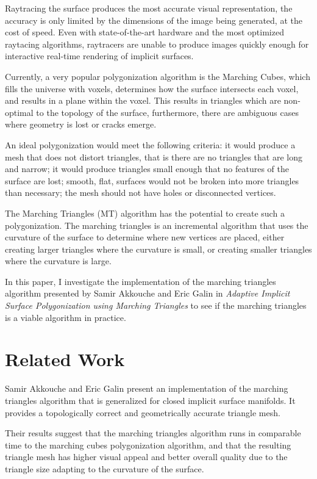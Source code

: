 \documentclass[conference]{acmsiggraph}
\begin{document}
Raytracing the surface produces the most accurate visual representation, the
accuracy is only limited by the dimensions of the image being generated, at the
cost of speed. Even with state-of-the-art hardware and the most optimized
raytacing algorithms, raytracers are unable to produce images quickly enough
for interactive real-time rendering of implicit surfaces.

Currently, a very popular polygonization algorithm is the Marching Cubes, which
fills the universe with voxels, determines how the surface intersects each
voxel, and results in a plane within the voxel. This results in triangles which
are non-optimal to the topology of the surface, furthermore, there are
ambiguous cases where geometry is lost or cracks emerge.

An ideal polygonization would meet the following criteria:
it would produce a mesh that does not distort triangles, that is there are no
triangles that are long and narrow; it would produce triangles small enough
that no features of the surface are lost; smooth, flat, surfaces would not be
broken into more triangles than necessary; the mesh should not have holes or
disconnected vertices.

The Marching Triangles (MT) algorithm has the potential to create such a
polygonization. The marching triangles is an incremental algorithm that uses
the curvature of the surface to determine where new vertices are placed, either
creating larger triangles where the curvature is small, or creating smaller
triangles where the curvature is large.

In this paper, I investigate the implementation of the marching triangles
algorithm presented by Samir Akkouche and Eric Galin in \textit{Adaptive
Implicit Surface Polygonization using Marching Triangles} to see if the
marching triangles is a viable algorithm in practice.


\section{Related Work}

Samir Akkouche and Eric Galin present an implementation of the marching
triangles algorithm that is generalized for closed implicit surface manifolds.
It provides a topologically correct and geometrically accurate triangle mesh.

Their results suggest that the marching triangles algorithm runs in comparable
time to the marching cubes polygonization algorithm, and that the resulting
triangle mesh has higher visual appeal and better overall quality due to the
triangle size adapting to the curvature of the surface.
\end{document}
